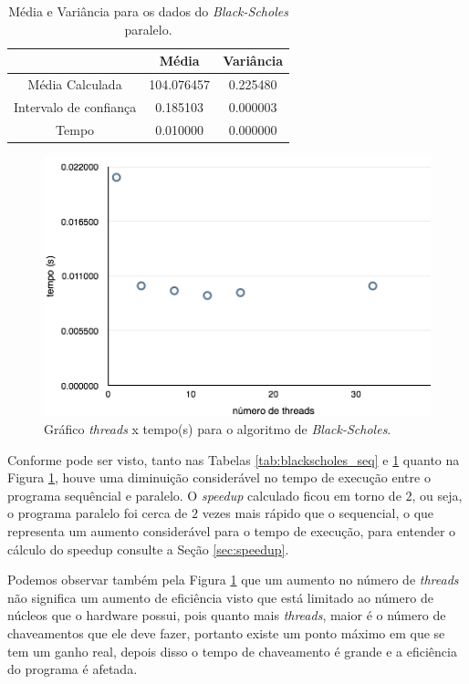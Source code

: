 \documentclass[11pt,twoside]{article}
\begin{document}
\begin{table}[ht]
\begin{tabular}{|c|c|c|}
             & Média & Variância \\ \hline
            Média Calculada & 104.076457 & 0.225480 \\ \hline
            Intervalo de confiança & 0.185103 & 0.000003\\ \hline
            Tempo & 0.010000 & 0.000000 \\ \hline
            
            
            \end{tabular}
        \caption{Média e Variância para os dados do {\it Black-Scholes} paralelo.}
        \label{tab:blackscholes_par}
        \end{table}
        
        \begin{figure}[ht]
            \centering
        	\includegraphics[scale=0.8]{figures/grafico_blackscholes.png}
    		\caption{Gráfico {\it threads} x tempo(s) para o algoritmo de {\it Black-Scholes}.}
    		\label{img:grafico_blackscholes}
    	\end{figure}
       
        Conforme pode ser visto, tanto nas Tabelas \ref{tab:blackscholes_seq} e
        \ref{tab:blackscholes_par} quanto na Figura \ref{img:grafico_blackscholes}, houve
        uma diminuição considerável no tempo de execução entre o programa sequêncial e paralelo.
        O {\it speedup } calculado ficou em torno de $2$, ou seja, o programa paralelo
        foi cerca de $2$ vezes mais rápido que o sequencial, o que representa um aumento
        considerável para o tempo de execução, para entender o cálculo do speedup
        consulte a Seção \ref{sec:speedup}.
        
        Podemos observar também pela Figura \ref{img:grafico_blackscholes} que um aumento
        no número de {\it threads} não significa um aumento de eficiência visto que está
        limitado ao número de núcleos que o hardware possui, pois quanto mais {\it threads},
        maior é o número de chaveamentos que ele deve fazer, portanto existe um ponto máximo
        em que se tem um ganho real, depois disso o tempo de chaveamento é grande e a 
        eficiência do programa é afetada.
\end{document}
